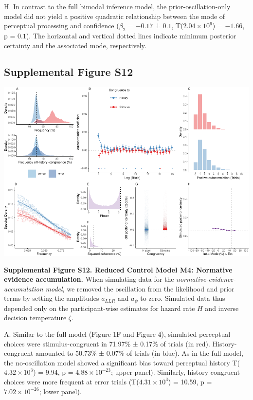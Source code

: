 \documentclass[
]{article}
\begin{document}
H. In contrast to the full bimodal inference model, the
prior-oscillation-only model did not yield a positive quadratic
relationship between the mode of perceptual processing and confidence
(\(\beta_2\) = \(-0.17\) ± \(0.1\),
T(\(\ensuremath{2.04\times 10^{6}}\)) = \(-1.66\), p = \(0.1\)). The
horizontal and vertical dotted lines indicate minimum posterior
certainty and the associated mode, respectively.

\newpage

\hypertarget{supplemental-figure-s12}{%
\subsection{Supplemental Figure S12}\label{supplemental-figure-s12}}

\includegraphics{modes_mouse_rev1b_files/figure-latex/Supplemental_Figure_S12-1.pdf}

\textbf{Supplemental Figure S12. Reduced Control Model M4: Normative
evidence accumulation.} When simulating data for the
\emph{normative-evidence-accumulation model}, we removed the oscillation
from the likelihood and prior terms by setting the amplitudes
\(a_{LLR}\) and \(a_{\psi}\) to zero. Simulated data thus depended only
on the participant-wise estimates for hazard rate \(H\) and inverse
decision temperature \(\zeta\).

A. Similar to the full model (Figure 1F and Figure 4), simulated
perceptual choices were stimulus-congruent in 71.97\% ± 0.17\% of trials
(in red). History-congruent amounted to 50.73\% ± 0.07\% of trials (in
blue). As in the full model, the no-oscillation model showed a
significant bias toward perceptual history
T(\ensuremath{4.32\times 10^{3}}) = 9.94, p =
\(\ensuremath{4.88\times 10^{-23}}\); upper panel). Similarly,
history-congruent choices were more frequent at error trials
(T(\ensuremath{4.31\times 10^{3}}) = 10.59, p =
\(\ensuremath{7.02\times 10^{-26}}\); lower panel).
\end{document}
